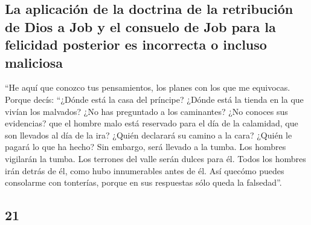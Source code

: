 \begin{paracol}{2}
\hypertarget{la-aplicaciuxf3n-de-la-doctrina-de-la-retribuciuxf3n-de-dios-a-job-y-el-consuelo-de-job-para-la-felicidad-posterior-es-incorrecta-o-incluso-maliciosa}{%
\subsection{La aplicación de la doctrina de la retribución de Dios a Job
y el consuelo de Job para la felicidad posterior es incorrecta o incluso
maliciosa}\label{la-aplicaciuxf3n-de-la-doctrina-de-la-retribuciuxf3n-de-dios-a-job-y-el-consuelo-de-job-para-la-felicidad-posterior-es-incorrecta-o-incluso-maliciosa}}

 ``He aquí que conozco tus pensamientos, los planes con
los que me equivocas.  Porque decís: ``¿Dónde está la
casa del príncipe? ¿Dónde está la tienda en la que vivían los malvados?
 ¿No has preguntado a los caminantes? ¿No conoces sus
evidencias?  que el hombre malo está reservado para el
día de la calamidad, que son llevados al día de la ira? 
¿Quién declarará su camino a la cara? ¿Quién le pagará lo que ha hecho?
 Sin embargo, será llevado a la tumba. Los hombres
vigilarán la tumba.  Los terrones del valle serán dulces
para él. Todos los hombres irán detrás de él, como hubo innumerables
antes de él.  Así quecómo puedes consolarme con
tonterías, porque en sus respuestas sólo queda la falsedad''.

\switchcolumn
\begin{otherlanguage}{english}

\hypertarget{section-41}{%
\section{21}\label{section-41}}


\end{otherlanguage}
\end{paracol}
